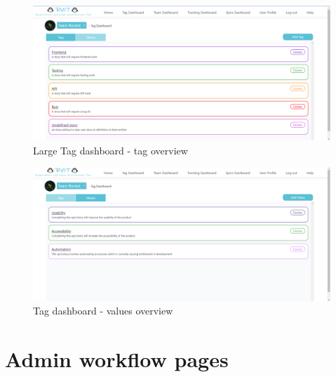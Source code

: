 \documentclass{l4proj}
\begin{document}
\begin{appendices}
\begin{figure}[h!]
\centering
\includegraphics[scale=0.4]{dissertation/images/TagDashboardOne.png}
\caption{Large Tag dashboard - tag overview}
\label{fig: large tag dashboard - tag overview}
\end{figure}
\hfill
\begin{figure}[h!]
\centering
\includegraphics[scale=0.4]{dissertation/images/TagDashboardTwo.png}
\caption{Tag dashboard - values overview}
\label{fig:large Tag dashboard - values overviews}
\end{figure}


\chapter{Admin workflow pages}
\label{app: admin workflow}


\end{appendices}
\end{document}
